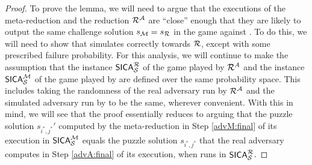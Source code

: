 \begin{proof}
  To prove the lemma,
  we will need to argue that the executions of the meta-reduction \redM
  and the reduction \(\redR^{\advA}\) are ``close'' enough
  that they are likely to output the same challenge solution \(s_{\redM} = s_{\redR}\)
  in the \SICA game against \Simple.
  To do this, we will need to show that \redM simulates \advA
  correctly towards \(\redR\), except with some prescribed failure probability.
  For this analysis, we will continue to make the assumption that
  the instance \(\SICA_{\Simple}^{\redR}\) of the \SICA game played by \(\redR^{A}\)
  and the instance \(\mathsf{SICA}_{\mathcal{S}}^{\mathcal{M}}\) of the \SICA game played by \redM
  are defined over the same probability space.
  This includes taking the randomness of the real adversary
  \advA run by \(\redR^{\advA}\)
  and the simulated adversary run by \redM to be the same,
  wherever convenient.
  With this in mind, we will see that
  the proof essentially reduces to arguing that
  the puzzle solution \(s_{i^{*},j^{*}}'\) computed by the meta-reduction
  \redM in Step \ref{advM:final} of its execution in \(\mathsf{SICA}_{\mathcal{S}}^{\mathcal{M}}\)
  equals the puzzle solution \(s_{i^{*},j^{*}}\)
  that the real adversary \advA computes in Step \ref{advA:final} of its execution,
  when \redR runs \advA in \(\SICA_{\Simple}^{\redR}\).


\end{proof}
